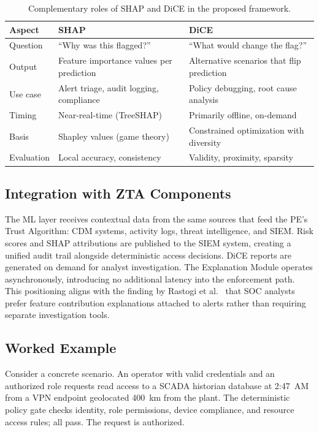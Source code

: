 \documentclass[conference]{IEEEtran}
\begin{document}
\begin{table}[t]
\centering
\caption{Complementary roles of SHAP and DiCE in the proposed framework.}
\label{tab:shap_dice}
\begin{tabular}{p{1.8cm}p{2.8cm}p{2.8cm}}
\toprule
\textbf{Aspect} & \textbf{SHAP} & \textbf{DiCE} \\
\midrule
Question & ``Why was this flagged?'' & ``What would change the flag?'' \\
\addlinespace
Output & Feature importance values per prediction & Alternative scenarios that flip prediction \\
\addlinespace
Use case & Alert triage, audit logging, compliance & Policy debugging, root cause analysis \\
\addlinespace
Timing & Near-real-time (TreeSHAP) & Primarily offline, on-demand \\
\addlinespace
Basis & Shapley values (game theory) & Constrained optimization with diversity \\
\addlinespace
Evaluation & Local accuracy, consistency~\cite{lundberg2017} & Validity, proximity, sparsity~\cite{verma2024} \\
\bottomrule
\end{tabular}
\end{table}

\subsection{Integration with ZTA Components}

The ML layer receives contextual data from the same sources that feed the PE's Trust Algorithm: CDM systems, activity logs, threat intelligence, and SIEM. Risk scores and SHAP attributions are published to the SIEM system, creating a unified audit trail alongside deterministic access decisions. DiCE reports are generated on demand for analyst investigation. The Explanation Module operates asynchronously, introducing no additional latency into the enforcement path. This positioning aligns with the finding by Rastogi et al.~\cite{rastogi2025} that SOC analysts prefer feature contribution explanations attached to alerts rather than requiring separate investigation tools.

\subsection{Worked Example}

Consider a concrete scenario. An operator with valid credentials and an authorized role requests read access to a SCADA historian database at 2:47~AM from a VPN endpoint geolocated 400~km from the plant. The deterministic policy gate checks identity, role permissions, device compliance, and resource access rules; all pass. The request is authorized.
\end{document}
